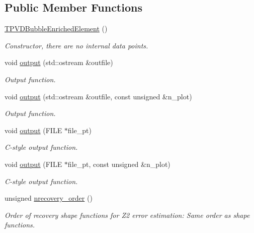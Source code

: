\subsection*{Public Member Functions}
\begin{DoxyCompactItemize}
\item 
\hyperlink{classoomph_1_1TPVDBubbleEnrichedElement_a79f95cdb37f60a18bd00cdcc11f3963e}{T\+P\+V\+D\+Bubble\+Enriched\+Element} ()
\begin{DoxyCompactList}\small\item\em Constructor, there are no internal data points. \end{DoxyCompactList}\item 
void \hyperlink{classoomph_1_1TPVDBubbleEnrichedElement_a4b2c44ad460959d1c3862eec3b879573}{output} (std\+::ostream \&outfile)
\begin{DoxyCompactList}\small\item\em Output function. \end{DoxyCompactList}\item 
void \hyperlink{classoomph_1_1TPVDBubbleEnrichedElement_a88ae1b66e5b6ca42c88046f615632c0a}{output} (std\+::ostream \&outfile, const unsigned \&n\+\_\+plot)
\begin{DoxyCompactList}\small\item\em Output function. \end{DoxyCompactList}\item 
void \hyperlink{classoomph_1_1TPVDBubbleEnrichedElement_a7ca640dacf5edd48e1f726a09c207a9b}{output} (F\+I\+LE $\ast$file\+\_\+pt)
\begin{DoxyCompactList}\small\item\em C-\/style output function. \end{DoxyCompactList}\item 
void \hyperlink{classoomph_1_1TPVDBubbleEnrichedElement_a703ae35a4f6d398ec8bb125d0d656418}{output} (F\+I\+LE $\ast$file\+\_\+pt, const unsigned \&n\+\_\+plot)
\begin{DoxyCompactList}\small\item\em C-\/style output function. \end{DoxyCompactList}\item 
unsigned \hyperlink{classoomph_1_1TPVDBubbleEnrichedElement_a865b7401a12a822e3d24c58f7418fb97}{nrecovery\+\_\+order} ()
\begin{DoxyCompactList}\small\item\em Order of recovery shape functions for Z2 error estimation\+: Same order as shape functions. \end{DoxyCompactList}\item 

\end{DoxyCompactItemize}
